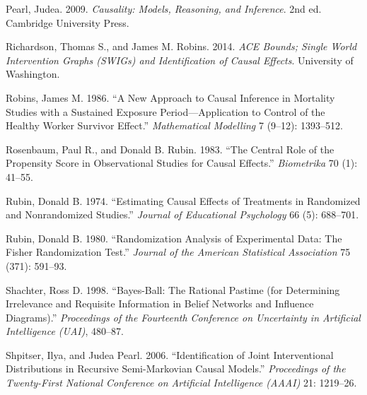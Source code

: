 \documentclass[
  a4paper,
]{book}
\newlength{\cslhangindent}
\newenvironment{CSLReferences}[2] %
 {\begin{list}{}{%
  \setlength{\itemindent}{0pt}
  \setlength{\leftmargin}{0pt}
  \setlength{\parsep}{0pt}
  \ifodd #1
   \setlength{\leftmargin}{\cslhangindent}
   \setlength{\itemindent}{-1\cslhangindent}
  \fi
  \setlength{\itemsep}{#2\baselineskip}}}
 {\end{list}}
\begin{document}
\begin{CSLReferences}{1}{1}
Pearl, Judea. 2009. \emph{Causality: Models, Reasoning, and Inference}.
2nd ed. Cambridge University Press.

Richardson, Thomas S., and James M. Robins. 2014. \emph{{ACE} Bounds;
Single World Intervention Graphs ({SWIGs}) and Identification of Causal
Effects}. University of Washington.

Robins, James M. 1986. {``A New Approach to Causal Inference in
Mortality Studies with a Sustained Exposure Period---Application to
Control of the Healthy Worker Survivor Effect.''} \emph{Mathematical
Modelling} 7 (9--12): 1393--512.

Rosenbaum, Paul R., and Donald B. Rubin. 1983. {``The Central Role of
the Propensity Score in Observational Studies for Causal Effects.''}
\emph{Biometrika} 70 (1): 41--55.

Rubin, Donald B. 1974. {``Estimating Causal Effects of Treatments in
Randomized and Nonrandomized Studies.''} \emph{Journal of Educational
Psychology} 66 (5): 688--701.

Rubin, Donald B. 1980. {``Randomization Analysis of Experimental Data:
The {Fisher} Randomization Test.''} \emph{Journal of the American
Statistical Association} 75 (371): 591--93.

Shachter, Ross D. 1998. {``Bayes-Ball: The Rational Pastime (for
Determining Irrelevance and Requisite Information in Belief Networks and
Influence Diagrams).''} \emph{Proceedings of the Fourteenth Conference
on Uncertainty in Artificial Intelligence (UAI)}, 480--87.

Shpitser, Ilya, and Judea Pearl. 2006. {``Identification of Joint
Interventional Distributions in Recursive Semi-{M}arkovian Causal
Models.''} \emph{Proceedings of the Twenty-First National Conference on
Artificial Intelligence (AAAI)} 21: 1219--26.

\end{CSLReferences}


\backmatter
\end{document}
